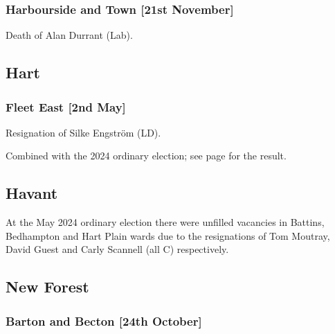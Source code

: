 \documentclass[a4paper,openany]{book}
\begin{document}
\begin{resultsiii}
\subsubsection*{Harbourside and Town \hspace*{\fill}\nolinebreak[1]%
	\enspace\hspace*{\fill}
	[21st November]}


Death of Alan Durrant (Lab).

\subsection*{Hart}

\subsubsection*{Fleet East \hspace*{\fill}\nolinebreak[1]%
	\enspace\hspace*{\fill}
	[2nd May]}


Resignation of Silke Engström (LD).

Combined with the 2024 ordinary election; see page \pageref{HartFleetEast} for the result.

\subsection*{Havant}

At the May 2024 ordinary election there were unfilled vacancies in Battins, Bedhampton and Hart Plain wards due to the resignations of Tom Moutray, David Guest and Carly Scannell (all C) respectively.%

\subsection*{New Forest}

\subsubsection*{Barton and Becton \hspace*{\fill}\nolinebreak[1]%
	\enspace\hspace*{\fill}
	[24th October]}


\end{resultsiii}
\end{document}
